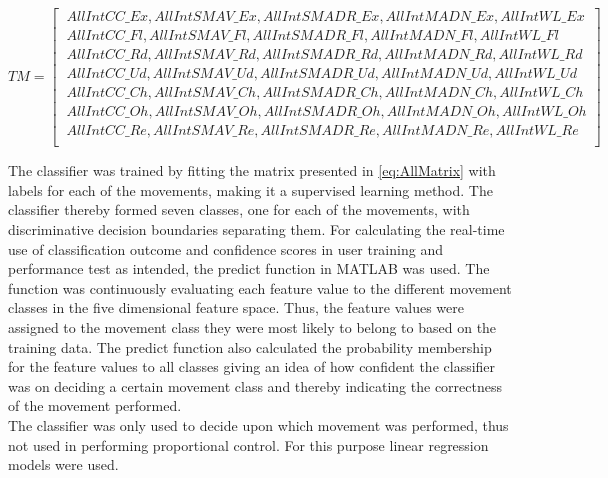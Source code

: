 \small \begin{equation} \label{eq:AllMatrix}
TM=\begin{bmatrix} 
\ AllIntCC\_Ex, AllIntSMAV\_Ex, AllIntSMADR\_Ex, AllIntMADN\_Ex, AllIntWL\_Ex \\
\ AllIntCC\_Fl, AllIntSMAV\_Fl, AllIntSMADR\_Fl, AllIntMADN\_Fl, AllIntWL\_Fl \\
\ AllIntCC\_Rd, AllIntSMAV\_Rd, AllIntSMADR\_Rd, AllIntMADN\_Rd, AllIntWL\_Rd \\
\ AllIntCC\_Ud, AllIntSMAV\_Ud, AllIntSMADR\_Ud, AllIntMADN\_Ud, AllIntWL\_Ud \\
\ AllIntCC\_Ch, AllIntSMAV\_Ch, AllIntSMADR\_Ch, AllIntMADN\_Ch, AllIntWL\_Ch \\
\ AllIntCC\_Oh, AllIntSMAV\_Oh, AllIntSMADR\_Oh, AllIntMADN\_Oh, AllIntWL\_Oh \\
\ AllIntCC\_Re, AllIntSMAV\_Re, AllIntSMADR\_Re, AllIntMADN\_Re, AllIntWL\_Re \\
\end{bmatrix}
\end{equation}

\normalsize
The classifier was trained by fitting the matrix presented in \eqref{eq:AllMatrix} with labels for each of the movements, making it a supervised learning method. The classifier thereby formed seven classes, one for each of the movements, with discriminative decision boundaries separating them. For calculating the real-time use of classification outcome and confidence scores in user training and performance test as intended, the predict function in MATLAB was used. The function was continuously evaluating each feature value to the different movement classes in the five dimensional feature space. Thus, the feature values were assigned to the movement class they were most likely to belong to based on the training data. The predict function also calculated the probability membership for the feature values to all classes giving an idea of how confident the classifier was on deciding a certain movement class and thereby indicating the correctness of the movement performed. \\ 
The classifier was only used to decide upon which movement was performed, thus not used in performing proportional control. For this purpose linear regression models were used. 


